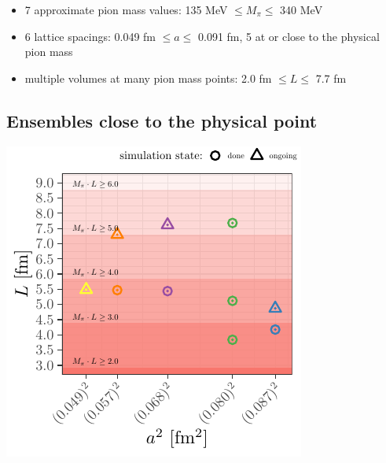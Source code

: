\documentclass[a0,portrait]{a0poster}
\begin{document}
\begin{multicols}{2}
\begin{center}
    \end{center}
    \begin{itemize}
      \item 7 approximate pion mass values: 135 MeV $\leq M_\pi \leq $ 340 MeV
      \item 6 lattice spacings: 0.049 fm $\leq a \leq$ 0.091 fm, 5 at or close to the physical pion mass
      \item multiple volumes at many pion mass points: 2.0 fm $\leq L \leq$ 7.7 fm
    \end{itemize}
    \subsection*{Ensembles close to the physical point}

    \begin{minipage}{0.42\linewidth}
      \begin{center}
        \includegraphics[width=\linewidth]{ensembles_phys_point}
      \end{center}
    \end{minipage}
    \hspace{0.04\linewidth}
    \begin{minipage}{0.52\linewidth}
      \begin{center}

\end{center}
\end{minipage}
\end{multicols}
\end{document}
